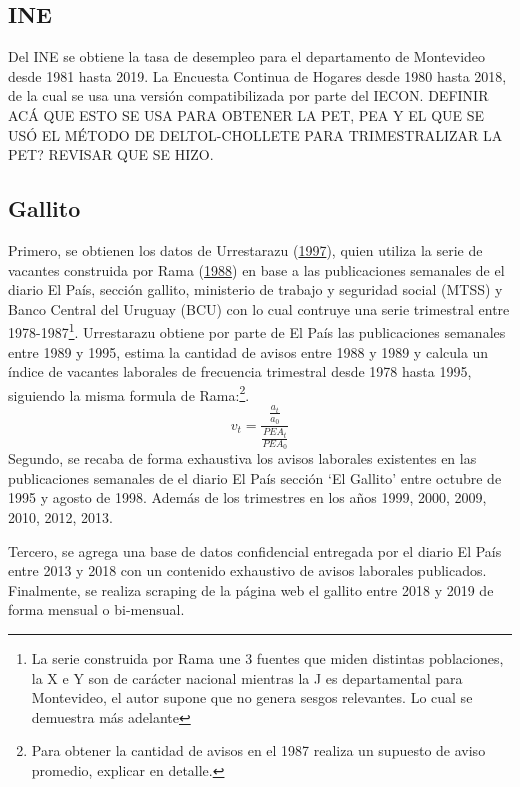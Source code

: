 \documentclass[12pt,twoside]{reedthesis}
\begin{document}
\hypertarget{ine}{%
\subsection*{INE}\label{ine}}

Del INE se obtiene la tasa de desempleo para el departamento de Montevideo desde 1981 hasta 2019.
La Encuesta Continua de Hogares desde 1980 hasta 2018, de la cual se usa una versión compatibilizada por parte del IECON.
DEFINIR ACÁ QUE ESTO SE USA PARA OBTENER LA PET, PEA Y EL QUE SE USÓ EL MÉTODO DE DELTOL-CHOLLETE PARA TRIMESTRALIZAR LA PET? REVISAR QUE SE HIZO.

\hypertarget{gallito}{%
\subsection*{Gallito}\label{gallito}}

Primero, se obtienen los datos de Urrestarazu (\protect\hyperlink{ref-Urrestarazu1997}{1997}), quien utiliza la serie de vacantes construida por Rama (\protect\hyperlink{ref-Rama1988}{1988}) en base a las publicaciones semanales de el diario El País, sección gallito, ministerio de trabajo y seguridad social (MTSS) y Banco Central del Uruguay (BCU) con lo cual contruye una serie trimestral entre 1978-1987\footnote{La serie construida por Rama une 3 fuentes que miden distintas poblaciones, la  X e Y son de carácter nacional mientras la J es departamental para Montevideo, el autor supone que no genera sesgos relevantes. Lo cual se demuestra más adelante}. Urrestarazu obtiene por parte de El País las publicaciones semanales entre 1989 y 1995, estima la cantidad de avisos entre 1988 y 1989 y calcula un índice de vacantes laborales de frecuencia trimestral desde 1978 hasta 1995, siguiendo la misma formula de Rama:\footnote{Para obtener la cantidad de avisos en el 1987 realiza un supuesto de aviso promedio, explicar en detalle.}.
\begin{equation}
v_t = \frac{\frac{a_t}{a_0}}{\frac{PEA_t}{PEA_0}}
\end{equation}
Segundo, se recaba de forma exhaustiva los avisos laborales existentes en las publicaciones semanales de el diario El País sección `El Gallito' entre octubre de 1995 y agosto de 1998. Además de los trimestres en los años 1999, 2000, 2009, 2010, 2012, 2013.

Tercero, se agrega una base de datos confidencial entregada por el diario El País entre 2013 y 2018 con un contenido exhaustivo de avisos laborales publicados. Finalmente, se realiza scraping de la página web el gallito entre 2018 y 2019 de forma mensual o bi-mensual.
\end{document}
